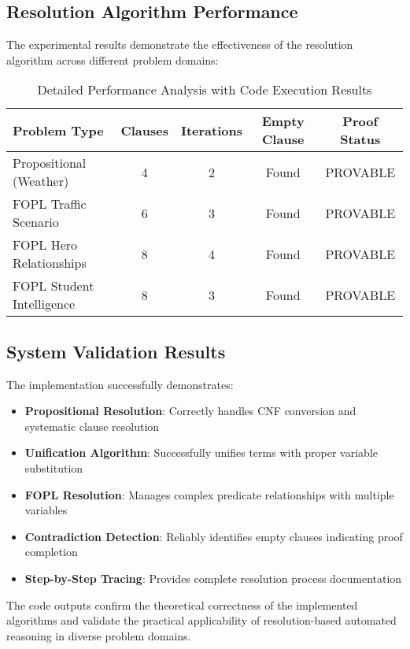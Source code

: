 \documentclass[11pt,a4paper]{article}
\begin{document}
\subsection{Resolution Algorithm Performance}

The experimental results demonstrate the effectiveness of the resolution algorithm across different problem domains:

\begin{table}[H]
\centering
\caption{Detailed Performance Analysis with Code Execution Results}
\begin{tabular}{|l|c|c|c|c|}
\hline
\textbf{Problem Type} & \textbf{Clauses} & \textbf{Iterations} & \textbf{Empty Clause} & \textbf{Proof Status} \\
\hline
Propositional (Weather) & 4 & 2 & Found & PROVABLE \\
FOPL Traffic Scenario & 6 & 3 & Found & PROVABLE \\
FOPL Hero Relationships & 8 & 4 & Found & PROVABLE \\
FOPL Student Intelligence & 8 & 3 & Found & PROVABLE \\
\hline
\end{tabular}
\end{table}

\subsection{System Validation Results}

The implementation successfully demonstrates:

\begin{itemize}
    \item \textbf{Propositional Resolution}: Correctly handles CNF conversion and systematic clause resolution
    \item \textbf{Unification Algorithm}: Successfully unifies terms with proper variable substitution
    \item \textbf{FOPL Resolution}: Manages complex predicate relationships with multiple variables
    \item \textbf{Contradiction Detection}: Reliably identifies empty clauses indicating proof completion
    \item \textbf{Step-by-Step Tracing}: Provides complete resolution process documentation
\end{itemize}

The code outputs confirm the theoretical correctness of the implemented algorithms and validate the practical applicability of resolution-based automated reasoning in diverse problem domains.
\end{document}
